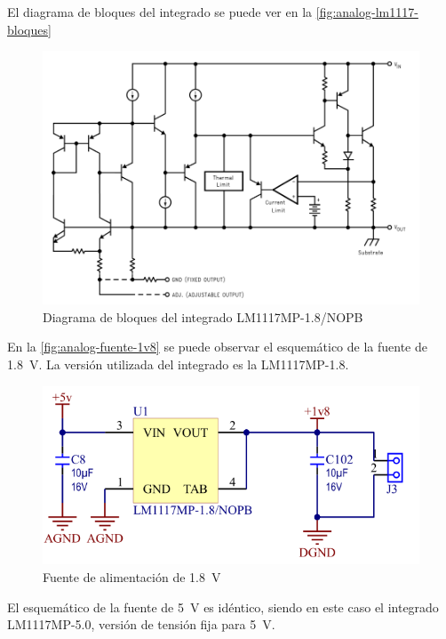 \documentclass[../et.tex]{subfiles}
\begin{document}
  El diagrama de bloques del integrado se puede ver en la \autoref{fig:analog-lm1117-bloques}

  \begin{figure}[!htbp]
    \centering
    \includegraphics[scale=0.6]{../images/analog-lm1117-bloques.png}
    \caption{Diagrama de bloques del integrado LM1117MP-1.8/NOPB}
    \label{fig:analog-lm1117-bloques}
  \end{figure}

  En la \autoref{fig:analog-fuente-1v8} se puede observar el esquemático de la fuente de \SI{1.8}{V}. La versión utilizada del integrado es la LM1117MP-1.8.

  \begin{figure}[!htbp]
    \centering
    \includegraphics[scale=0.6]{../images/analog-fuente-1v8.png}
    \caption{Fuente de alimentación de \SI{1.8}{V}}
    \label{fig:analog-fuente-1v8}
  \end{figure}

  El esquemático de la fuente de \SI{5}{V} es idéntico, siendo en este caso el integrado LM1117MP-5.0, versión de tensión fija para \SI{5}{V}.
\end{document}
